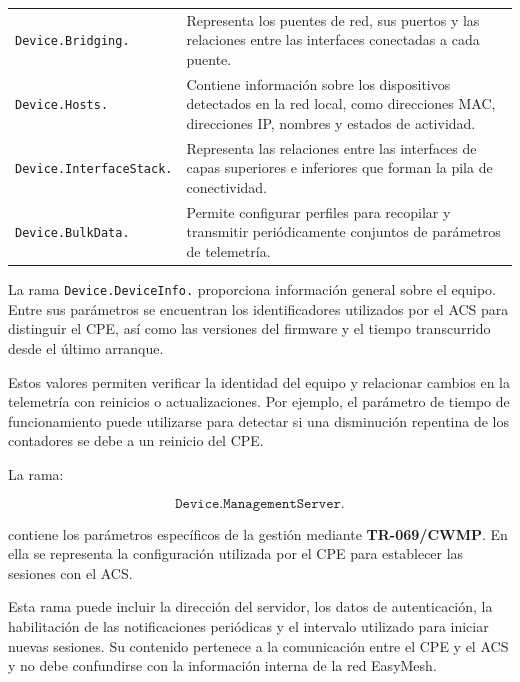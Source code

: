 \begin{table}[H]
\begin{tabular}{
        p{}
        p{}
    }
        \texttt{Device.Bridging.}
        &
        Representa los puentes de red, sus puertos y las relaciones entre
        las interfaces conectadas a cada puente.
        \\

        \texttt{Device.Hosts.}
        &
        Contiene información sobre los dispositivos detectados en la red
        local, como direcciones MAC, direcciones IP, nombres y estados de
        actividad.
        \\

        \texttt{Device.InterfaceStack.}
        &
        Representa las relaciones entre las interfaces de capas
        superiores e inferiores que forman la pila de conectividad.
        \\

        \texttt{Device.BulkData.}
        &
        Permite configurar perfiles para recopilar y transmitir
        periódicamente conjuntos de parámetros de telemetría.
        \\

        \hline
    \end{tabular}
\end{table}

La rama \texttt{Device.DeviceInfo.} proporciona información general sobre
el equipo. Entre sus parámetros se encuentran los identificadores
utilizados por el ACS para distinguir el CPE, así como las versiones del
firmware y el tiempo transcurrido desde el último arranque.

Estos valores permiten verificar la identidad del equipo y relacionar
cambios en la telemetría con reinicios o actualizaciones. Por ejemplo, el
parámetro de tiempo de funcionamiento puede utilizarse para detectar si
una disminución repentina de los contadores se debe a un reinicio del CPE.

La rama:

\[
    \texttt{Device.ManagementServer.}
\]

contiene los parámetros específicos de la gestión mediante
\textbf{TR-069/CWMP}. En ella se representa la configuración utilizada
por el CPE para establecer las sesiones con el ACS.

Esta rama puede incluir la dirección del servidor, los datos de
autenticación, la habilitación de las notificaciones periódicas y el
intervalo utilizado para iniciar nuevas sesiones. Su contenido pertenece
a la comunicación entre el CPE y el ACS y no debe confundirse con la
información interna de la red EasyMesh.

